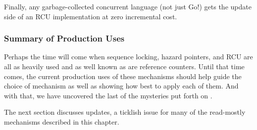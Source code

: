 Finally, any garbage-collected concurrent language (not just Go!\@) gets
the update side of an RCU implementation at zero incremental cost.

\subsubsection{Summary of Production Uses}
\label{sec:defer:Summary of Production Uses}

Perhaps the time will come when sequence locking, hazard pointers, and
RCU are all as heavily used and as well known as are reference counters.
Until that time comes, the current production uses of these mechanisms
should help guide the choice of mechanism as well as showing how best
to apply each of them.
And with that, we have uncovered the last of the mysteries put forth on
.

The next section discusses updates, a ticklish issue for many of the
read-mostly mechanisms described in this chapter.

